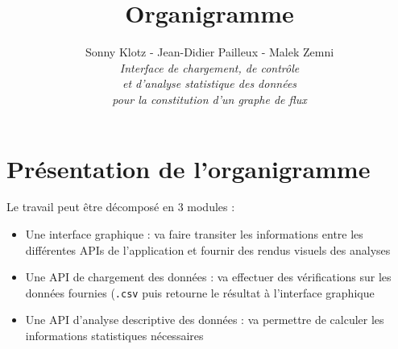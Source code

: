 
\usepackage{tikz}
\usepackage{inputenc}
\usetikzlibrary{arrows,automata}
\usetikzlibrary{positioning}
\geometry{top=3cm,bottom=3cm}

\title{\vspace{\fill}\textbf{\Huge Organigramme}}
\author{Sonny Klotz - Jean-Didier Pailleux - Malek Zemni\vspace{2em}\\\textit{Interface de chargement, de contrôle}\\\textit{et d’analyse statistique des données}\\\textit{pour la constitution d’un graphe de flux}\vspace{2em}}


\maketitle\vspace{\fill}
\newpage
	
	\section{Présentation de l'organigramme}
		Le travail peut être décomposé en 3 modules :
		\begin{itemize}
		\item Une interface graphique : va faire transiter les informations entre les différentes APIs de l'application et fournir des rendus visuels des analyses
		\item Une API de chargement des données : va effectuer des vérifications sur les données fournies (\lstinline!.csv! puis retourne le résultat à l'interface graphique
		\item Une API d'analyse descriptive des données : va permettre de calculer les informations statistiques nécessaires
		\end{itemize}
		
